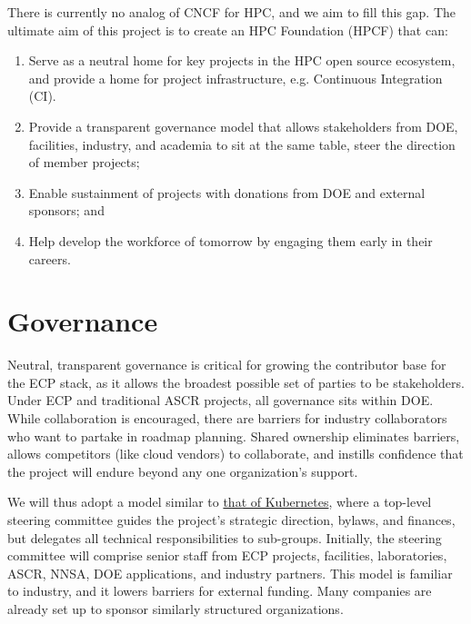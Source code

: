 \documentclass[11pt]{article}
\begin{document}
There is currently no analog of CNCF for HPC, and we aim to fill this gap. The ultimate
aim of this project is to create an HPC Foundation (HPCF) that can:
\begin{enumerate}
\item Serve as a neutral home for key projects in the HPC open source ecosystem, and
      provide a home for project infrastructure, e.g. Continuous Integration (CI).
\item Provide a transparent governance model that allows stakeholders from DOE, facilities,
      industry, and
      academia to sit at the same table, steer the direction of member projects;
\item Enable sustainment of projects with donations from DOE and external sponsors; and
\item Help develop the workforce of tomorrow by engaging them early in their careers.
\end{enumerate}

\section{Governance}

Neutral, transparent governance is critical for growing the contributor base for the ECP
stack, as it allows the broadest possible set of parties to be stakeholders. Under ECP
and traditional ASCR projects,
all governance sits within DOE. While collaboration is encouraged, there are barriers
for industry collaborators who want to partake in roadmap planning. Shared ownership
eliminates barriers, allows competitors (like cloud vendors) to collaborate, and
instills confidence that the project will endure beyond any one organization's support.

We will thus adopt a model similar to
\href{https://github.com/kubernetes/steering/blob/main/charter.md}{that of Kubernetes},
where a top-level steering committee guides the project's strategic direction, bylaws,
and finances, but delegates all technical responsibilities to sub-groups. Initially, the
steering committee will comprise senior staff from ECP projects, facilities,
laboratories, ASCR, NNSA, DOE applications, and industry partners. This model is
familiar to industry, and it lowers barriers for external funding. Many companies are
already set up to sponsor similarly structured organizations.
\end{document}
